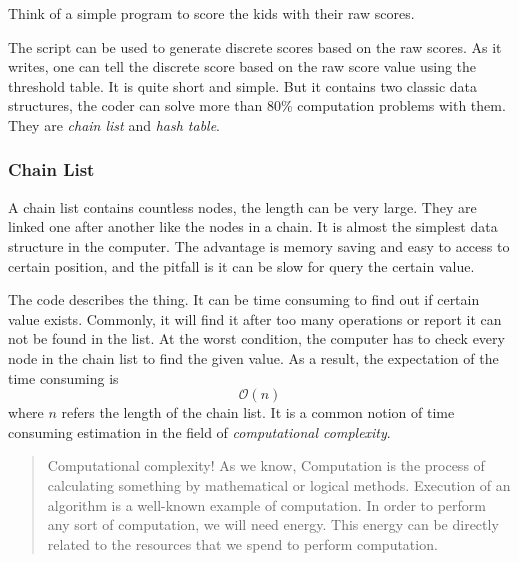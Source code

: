 Think of a simple program to score the kids with their raw scores.



The script can be used to generate discrete scores based on the raw scores.
As it writes, one can tell the discrete score based on the raw score value using the threshold table.
It is quite short and simple.
But it contains two classic data structures, the coder can solve more than 80\% computation problems with them.
They are \emph{chain list} and \emph{hash table}.

\subsubsection{Chain List}

A chain list contains countless nodes,
the length can be very large.
They are linked one after another like the nodes in a chain.
It is almost the simplest data structure in the computer.
The advantage is memory saving and easy to access to certain position,
and the pitfall is it can be slow for query the certain value.



The code describes the thing.
It can be time consuming to find out if certain value exists.
Commonly, it will find it after too many operations or report it can not be found in the list.
At the worst condition, the computer has to check every node in the chain list to find the given value.
As a result, the expectation of the time consuming is
\begin{equation}
    \label{Eq: cc-o1}
    \mathcal{O}(n)
\end{equation}
where $n$ refers the length of the chain list.
It is a common notion of time consuming estimation in the field of \emph{computational complexity}.

\begin{quote}
    Computational complexity!
    As we know, Computation is the process of calculating something by mathematical or logical methods.
    Execution of an algorithm is a well-known example of computation.
    In order to perform any sort of computation, we will need energy.
    This energy can be directly related to the resources that we spend to perform computation.

\end{quote}

